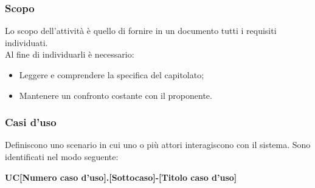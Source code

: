     \subsubsection{Scopo}
    Lo scopo dell'attività è quello di fornire in un documento tutti i requisiti individuati.\\
    Al fine di individuarli è necessario:
    \begin{itemize}
      \item Leggere e comprendere la specifica del capitolato;
      \item Mantenere un confronto costante con il proponente.
    \end{itemize}
    \subsubsection{Casi d'uso}
    Definiscono uno scenario in cui uno o più attori interagiscono con il sistema. Sono identificati nel modo seguente:
    \begin{center}
      \textbf{UC[Numero caso d'uso].[Sottocaso]-[Titolo caso d'uso]}\\
    \end{center}
